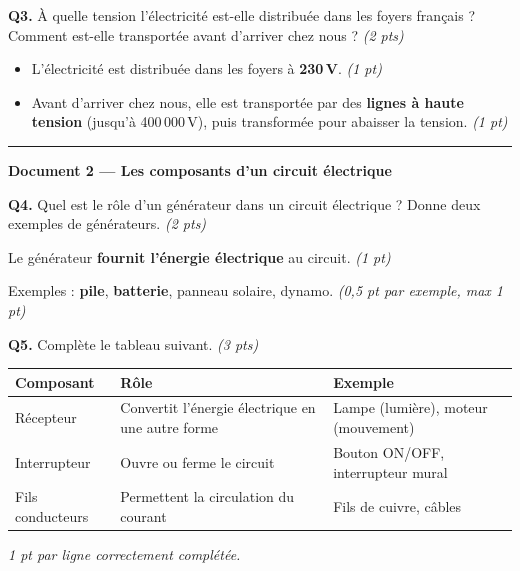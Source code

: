 \documentclass[11pt,a4paper]{article}
\renewcommand{\arraystretch}{1.8}
\begin{document}
\vspace{3mm}

\textbf{Q3.} À quelle tension l'électricité est-elle distribuée dans les foyers français ? Comment est-elle transportée avant d'arriver chez nous ? \hfill \textit{(2 pts)}

\begin{tcolorbox}[colback=green!5!white,colframe=green!75!black]
\begin{itemize}
  \item L'électricité est distribuée dans les foyers à \textbf{230\,V}. \textit{(1 pt)}
  \item Avant d'arriver chez nous, elle est transportée par des \textbf{lignes à haute tension} (jusqu'à 400\,000\,V), puis transformée pour abaisser la tension. \textit{(1 pt)}
\end{itemize}
\end{tcolorbox}

\vspace{5mm}
\hrule
\vspace{3mm}

\textbf{Document 2 --- Les composants d'un circuit électrique}

\vspace{3mm}

\textbf{Q4.} Quel est le rôle d'un générateur dans un circuit électrique ? Donne deux exemples de générateurs. \hfill \textit{(2 pts)}

\begin{tcolorbox}[colback=green!5!white,colframe=green!75!black]
Le générateur \textbf{fournit l'énergie électrique} au circuit. \textit{(1 pt)}

Exemples : \textbf{pile}, \textbf{batterie}, panneau solaire, dynamo. \textit{(0,5 pt par exemple, max 1 pt)}
\end{tcolorbox}

\vspace{3mm}

\textbf{Q5.} Complète le tableau suivant. \hfill \textit{(3 pts)}

\begin{tcolorbox}[colback=green!5!white,colframe=green!75!black]
\renewcommand{\arraystretch}{1.6}
\begin{tabularx}{\linewidth}{|l|X|X|}
\hline
\textbf{Composant} & \textbf{Rôle} & \textbf{Exemple} \\
\hline
Récepteur & Convertit l'énergie électrique en une autre forme & Lampe (lumière), moteur (mouvement) \\
\hline
Interrupteur & Ouvre ou ferme le circuit & Bouton ON/OFF, interrupteur mural \\
\hline
Fils conducteurs & Permettent la circulation du courant & Fils de cuivre, câbles \\
\hline
\end{tabularx}

\vspace{2mm}
\footnotesize\textit{1 pt par ligne correctement complétée.}
\end{tcolorbox}
\end{document}

